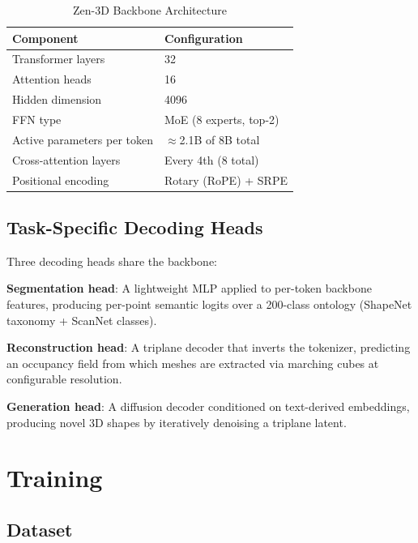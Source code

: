 \documentclass[11pt,a4paper]{article}
\begin{document}
\begin{table}[H]
\centering
\begin{tabular}{ll}
\toprule
\textbf{Component} & \textbf{Configuration} \\
\midrule
Transformer layers & 32 \\
Attention heads & 16 \\
Hidden dimension & 4096 \\
FFN type & MoE (8 experts, top-2) \\
Active parameters per token & $\approx$2.1B of 8B total \\
Cross-attention layers & Every 4th (8 total) \\
Positional encoding & Rotary (RoPE) + SRPE \\
\bottomrule
\end{tabular}
\caption{Zen-3D Backbone Architecture}
\end{table}

\subsection{Task-Specific Decoding Heads}

Three decoding heads share the backbone:

\textbf{Segmentation head}: A lightweight MLP applied to per-token backbone features, producing
per-point semantic logits over a 200-class ontology (ShapeNet taxonomy + ScanNet classes).

\textbf{Reconstruction head}: A triplane decoder that inverts the tokenizer, predicting an
occupancy field from which meshes are extracted via marching cubes at configurable resolution.

\textbf{Generation head}: A diffusion decoder conditioned on text-derived embeddings, producing
novel 3D shapes by iteratively denoising a triplane latent.

\section{Training}

\subsection{Dataset}
\end{document}
